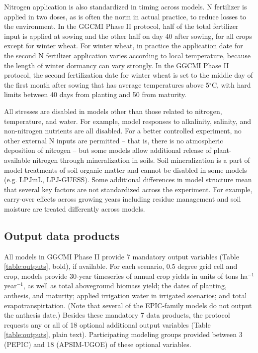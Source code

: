 \documentclass[gmd, manuscript]{copernicus} %
\begin{document}
Nitrogen application is also standardized in timing across models. 
N fertilizer is applied in two doses, as is often the norm in actual practice, to reduce losses to the environment. 
In the GGCMI Phase II protocol, half of the total fertilizer input is applied at sowing and the other half on day 40 after sowing, for all crops except for winter wheat. 
For winter wheat, in practice the application date for the second N fertilizer application varies according to local temperature, because the length of winter dormancy can vary strongly. 
In the GGCMI Phase II protocol, the second fertilization date for winter wheat is set to the middle day of the first month after sowing that has average temperatures above 5$^\circ$C, with hard limits between 40 days from planting and 50 from maturity.

All stresses are disabled in models other than those related to nitrogen, temperature, and water. 
For example, model responses to alkalinity, salinity, and non-nitrogen nutrients are all disabled. 
For a better controlled experiment, no other external N inputs are permitted -- that is, there is no atmospheric deposition of nitrogen --  but some models allow additional release of plant-available nitrogen through mineralization in soils. 
Soil mineralization is a part of model treatments of soil organic matter and cannot be disabled in some models (e.g. LPJmL, LPJ-GUESS). 
Some additional differences in model structure mean that several key factors are not standardized across the experiment. 
For example, carry-over effects across growing years including residue management and soil moisture are treated differently across models.

\subsection{Output data products}
All models in GGCMI Phase II provide 7 mandatory output variables (Table \ref{table:outputs}, bold), if available. 
For each scenario, 0.5 degree grid cell and crop, models provide 30-year timeseries of annual crop yields in units of tons ha$^{-1}$ year$^{-1}$, as well as total aboveground biomass yield; the dates of planting, anthesis, and maturity; applied irrigation water in irrigated scenarios; and total evapotranspirtation. 
(Note that several of the EPIC-family models do not output the anthesis date.)
Besides these mandatory 7 data products, the protocol requests any or all of 18 optional additional output variables (Table \ref{table:outputs}, plain text).
Participating modeling groups provided between 3 (PEPIC) and 18 (APSIM-UGOE) of these optional variables. 
\end{document}
